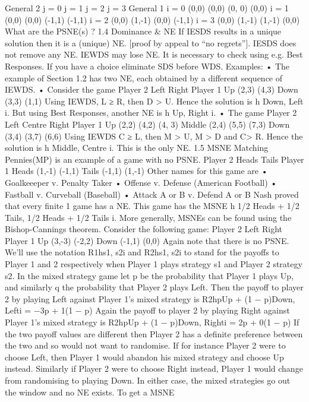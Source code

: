 General 2
j = 0 j = 1 j = 2 j = 3
General 1
i = 0 (0,0) (0,0) (0, 0) (0,0)
i = 1 (0,0) (0,0) (-1,1) (-1,1)
i = 2 (0,0) (1,-1) (0,0) (-1,1)
i = 3 (0,0) (1,-1) (1,-1) (0,0)
What are the PSNE(s) ?
1.4 Dominance & NE
If IESDS results in a unique solution then it is a (unique) NE. [proof by appeal to “no
regrets”]. IESDS does not remove any NE.
IEWDS may lose NE. It is necessary to check using e.g. Best Responses. If you have a
choice eliminate SDS before WDS. Examples:
• The example of Section 1.2 has two NE, each obtained by a different sequence of
IEWDS.
• Consider the game
Player 2
Left Right
Player 1 Up (2,3) (4,3)
Down (3,3) (1,1)
Using IEWDS, L ≥ R, then D > U. Hence the solution is h Down, Left i. But using
Best Responses, another NE is h Up, Right i.
• The game
Player 2
Left Centre Right
Player 1
Up (2,2) (4,2) (4, 3)
Middle (2,4) (5,5) (7,3)
Down (3,4) (3,7) (6,6)
Using IEWDS C ≥ L, then M > U, M > D and C> R. Hence the solution is
h Middle, Centre i. This is the only NE.
1.5 MSNE
Matching Pennies(MP) is an example of a game with no PSNE.
Player 2
Heads Tails
Player 1 Heads (1,-1) (-1,1)
Tails (-1,1) (1,-1)
Other names for this game are
• Goalkeeeper v. Penalty Taker
• Offense v. Defense (American Football)
• Fastball v. Curveball (Baseball)
• Attack A or B v. Defend A or B
Nash proved that every finite 1 game has a NE.
This game has the MSNE h 1/2 Heads + 1/2 Tails, 1/2 Heads + 1/2 Tails i.
More generally, MSNEs can be found using the Bishop-Cannings theorem. Consider the
following game:
Player 2
Left Right
Player 1 Up (3,-3) (-2,2)
Down (-1,1) (0,0)
Again note that there is no PSNE. We’ll use the notation R1hs1, s2i and R2hs1, s2i to
stand for the payoffs to Player 1 and 2 respectively when Player 1 plays strategy s1 and
Player 2 strategy s2.
In the mixed strategy game let p be the probability that Player 1 plays Up, and similarly
q the probability that Player 2 plays Left. Then the payoff to player 2 by playing Left
against Player 1’s mixed strategy is
R2hpUp + (1 − p)Down, Lefti = −3p + 1(1 − p)
Again the payoff to player 2 by playing Right against Player 1’s mixed strategy is
R2hpUp + (1 − p)Down, Righti = 2p + 0(1 − p)
If the two payoff values are different then Player 2 has a definite preference between the
two and so would not want to randomise. If for instance Player 2 were to choose Left, then
Player 1 would abandon his mixed strategy and choose Up instead. Similarly if Player 2
were to choose Right instead, Player 1 would change from randomising to playing Down.
In either case, the mixed strategies go out the window and no NE exists. To get a MSNE
